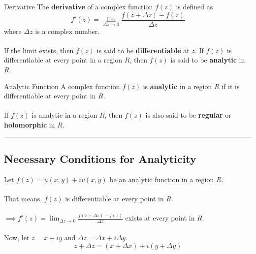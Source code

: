 \begin{definition}{Derivative}{}
    The \textbf{derivative} of a complex function $f(z)$ is defined as
    \[
        f'(z) = \lim_{\Delta z \to 0} \frac{f(z + \Delta z) - f(z)}{\Delta z}
    \]
    where $\Delta z$ is a complex number. \\~\\
    
    If the limit exists, then $f(z)$ is said to be \textbf{differentiable} at $z$. If $f(z)$ is differentiable at every point in a region $R$, then $f(z)$ is said to be \textbf{analytic} in $R$.
\end{definition}

\begin{definition}{Analytic Function}{}
    A complex function $f(z)$ is \textbf{analytic} in a region $R$ if it is differentiable at every point in $R$. \\~\\
    
    If $f(z)$ is analytic in a region $R$, then $f(z)$ is also said to be \textbf{regular} or \textbf{holomorphic} in $R$.
\end{definition}

\vspace{20pt}\rule{3in}{1pt}


\subsection{Necessary Conditions for Analyticity}
Let $f(z) = u(x,y) + iv(x,y)$ be an analytic function in a region $R$. \\~\\

That means, $f(z)$ is differentiable at every point in $R$. \\~\\

$\displaystyle\implies f'(z) = \lim_{\Delta z \to 0} \frac{f(z + \Delta z) - f(z)}{\Delta z}$ exists at every point in $R$. \\~\\

Now, let $z = x+iy$ and $\Delta z = \Delta x + i\Delta y$.
\[ z + \Delta z = (x + \Delta x) + i(y + \Delta y) \]


